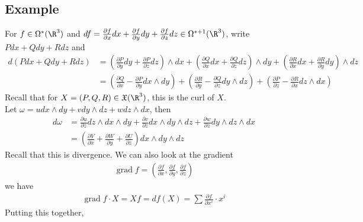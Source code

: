 \documentclass[11pt]{article}
\begin{document}
\subsection*{Example}
\label{sec:orga37baa6}
For \(f\in\Omega^{*}(\R^{3})\) and \(df=\frac{\partial f}{\partial x}dx+\frac{\partial f}{\partial y}dy+\frac{\partial f}{\partial z}dz\in\Omega^{*+1}(\R^{3})\), write \(Pdx+Qdy+Rdz\) and\\
\begin{align*}
  d(Pdx+Qdy+Rdz)
  &=\left( \frac{\partial P}{\partial y}dy+\frac{\partial P}{\partial z}dz \right)\wedge dx
  +\left( \frac{\partial Q}{\partial x}dx+\frac{\partial Q}{\partial z}dz \right)\wedge dy
  +\left( \frac{\partial R}{\partial x}dx+\frac{\partial R}{\partial y}dy \right)\wedge dz \\
  &=\left( \frac{\partial Q}{\partial x}-\frac{\partial P}{\partial y}dx\wedge dy \right)
  +\left( \frac{\partial R}{\partial y}-\frac{\partial Q}{\partial z}dy\wedge dz \right)
  +\left( \frac{\partial P}{\partial z}-\frac{\partial R}{\partial x}dz\wedge dx \right)
\end{align*}
Recall that for \(X=(P,Q,R)\in\mathfrak{X}(\R^{3})\), this is the curl of \(X\).\\
Let \(\omega=udx\wedge dy+vdy\wedge dz+wdz\wedge dx\), then\\
\begin{align*}
  d\omega
  &=\frac{\partial u}{\partial z}dz\wedge dx\wedge dy
  +\frac{\partial v}{\partial z}dx\wedge dy\wedge dz
  +\frac{\partial w}{\partial z}dy\wedge dz\wedge dx \\
  &=\left( \frac{\partial V}{\partial x}+\frac{\partial W}{\partial y}+\frac{\partial U}{\partial z} \right)dx\wedge dy\wedge dz
\end{align*}
Recall that this is divergence. We can also look at the gradient\\
\begin{align*}
  \operatorname{grad}f=\left( \frac{\partial f}{\partial x},\frac{\partial f}{\partial y},\frac{\partial f}{\partial z} \right)
\end{align*}
we have\\
\begin{align*}
  \operatorname{grad}f\cdot X
  =Xf
  =df(X)
  =\sum\frac{\partial f}{\partial x^{i}}\cdot x^{i}
\end{align*}
Putting this together,\\
\end{document}
